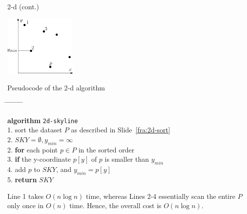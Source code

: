 \documentclass{beamer}
\def\tabpos{\hspace{4mm} \= \hspace{4mm} \= \hspace{4mm} \= \hspace{4mm} \= \hspace{4mm} \= \hspace{4mm} \= \hspace{4mm} \= \hspace{4mm} \= \hspace{4mm} \kill}
\begin{document}
\begin{frame}{2-d (cont.)}
\begin{small}
    \begin{center}
        \includegraphics[height=30mm]{./artwork/2d.eps}
    \end{center}
\end{small}
\end{frame}
\begin{frame}{Pseudocode of the 2-d algorithm}
\begin{small}
    \begin{tabbing}
        \tabpos

        {\bf algorithm} \texttt{2d-skyline} \\
        1.\>    sort the dataset $P$ as described in Slide~\ref{fra:2d-sort} \\
        2.\>    $SKY = \emptyset, y_{min} = \infty$ \\
        2.\>    {\bf for} each point $p \in P$ in the sorted order \\
        3.\>\>      {\bf if} the y-coordinate $p[y]$ of $p$ is smaller than $y_{min}$ \\
        4.\>\>\>        add $p$ to $SKY$, and $y_{min} = p[y]$ \\
        5.\>    {\bf return} $SKY$
    \end{tabbing}

    Line 1 takes $O(n\log n)$ time, whereas Lines 2-4 essentially scan the entire $P$ only once in $O(n)$ time. Hence, the overall cost is $O(n\log n)$.
\end{small}
\end{frame}
\end{document}
